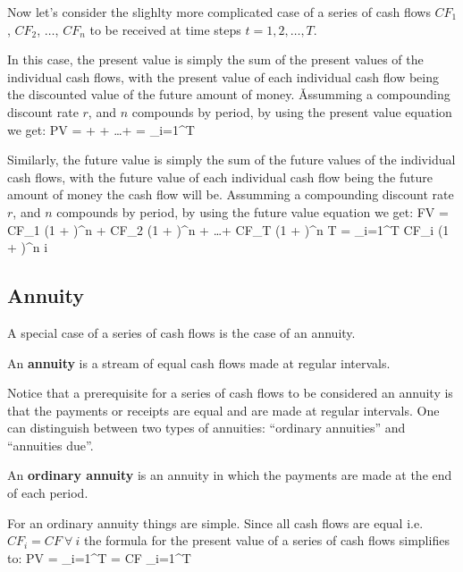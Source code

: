 Now let's consider the slighlty more complicated case of a series of cash flows $CF_1$, $CF_2$, $\ldots$, $CF_n$ to be
received at time steps $t=1, 2, \ldots, T$.


In this case, the present value is simply the sum of the present values of the individual cash flows, with the present
value of each individual cash flow being the discounted value of the future amount of money. \v

Assumming a compounding discount rate $r$, and $n$ compounds by period, by using the present value equation we get:
\bse \label{eq:pv_series}
PV =  +  + \ldots +  = \sum_{i=1}^T 
\ese

Similarly, the future value is simply the sum of the future values of the individual cash flows, with the future value
of each individual cash flow being the future amount of money the cash flow will be. Assumming a compounding
discount rate $r$, and $n$ compounds by period, by using the future value equation we get:
\bse
FV = CF_1 \cdot (1 + )^{n } + CF_2 \cdot (1 + )^{n } + \ldots + CF_T \cdot (1 +
)^{n \cdot T} = \sum_{i=1}^T CF_i \cdot (1 + )^{n \cdot i}
\ese

\subsection{Annuity}

A special case of a series of cash flows is the case of an annuity.

\bd[Annunity]
An \textbf{annuity} is a stream of equal cash flows made at regular intervals.
\ed

Notice that a prerequisite for a series of cash flows to be considered an annuity is that the payments or receipts are
equal and are made at regular intervals. One can distinguish between two types of annuities: ``ordinary annuities'' and
``annuities due''.

An \textbf{ordinary annuity} is an annuity in which the payments are made at the end of each period.
\ed


For an ordinary annuity things are simple. Since all cash flows are equal i.e.\ $CF_i = CF \: \forall \: i$ the formula
for
the present value of a series of cash flows simplifies to:
\bse
PV = \sum_{i=1}^T  = CF \cdot \sum_{i=1}^T 
\ese

